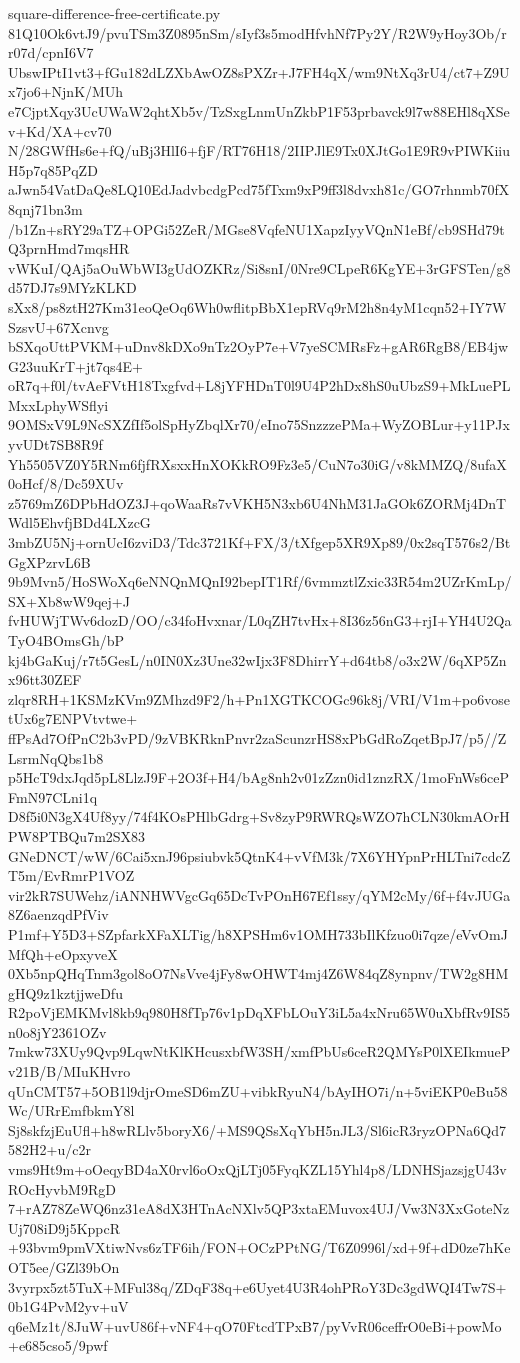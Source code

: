 \documentclass[11pt]{article}
\theoremstyle{definition}
\theoremstyle{remark}
\begin{document}
\begin{filecontents*}[overwrite]{square-difference-free-certificate.py}
81Q10Ok6vtJ9/pvuTSm3Z0895nSm/sIyf3s5modHfvhNf7Py2Y/R2W9yHoy3Ob/rr07d/cpnI6V7
UbswIPtI1vt3+fGu182dLZXbAwOZ8sPXZr+J7FH4qX/wm9NtXq3rU4/ct7+Z9Ux7jo6+NjnK/MUh
e7CjptXqy3UcUWaW2qhtXb5v/TzSxgLnmUnZkbP1F53prbavck9l7w88EHl8qXSev+Kd/XA+cv70
N/28GWfHs6e+fQ/uBj3HlI6+fjF/RT76H18/2IIPJlE9Tx0XJtGo1E9R9vPIWKiiuH5p7q85PqZD
aJwn54VatDaQe8LQ10EdJadvbcdgPcd75fTxm9xP9ff3l8dvxh81c/GO7rhnmb70fX8qnj71bn3m
/b1Zn+sRY29aTZ+OPGi52ZeR/MGse8VqfeNU1XapzIyyVQnN1eBf/cb9SHd79tQ3prnHmd7mqsHR
vWKuI/QAj5aOuWbWI3gUdOZKRz/Si8snI/0Nre9CLpeR6KgYE+3rGFSTen/g8d57DJ7s9MYzKLKD
sXx8/ps8ztH27Km31eoQeOq6Wh0wflitpBbX1epRVq9rM2h8n4yM1cqn52+IY7WSzsvU+67Xcnvg
bSXqoUttPVKM+uDnv8kDXo9nTz2OyP7e+V7yeSCMRsFz+gAR6RgB8/EB4jwG23uuKrT+jt7qs4E+
oR7q+f0l/tvAeFVtH18Txgfvd+L8jYFHDnT0l9U4P2hDx8hS0uUbzS9+MkLuePLMxxLphyWSflyi
9OMSxV9L9NcSXZfIf5olSpHyZbqlXr70/eIno75SnzzzePMa+WyZOBLur+y11PJxyvUDt7SB8R9f
Yh5505VZ0Y5RNm6fjfRXsxxHnXOKkRO9Fz3e5/CuN7o30iG/v8kMMZQ/8ufaX0oHcf/8/Dc59XUv
z5769mZ6DPbHdOZ3J+qoWaaRs7vVKH5N3xb6U4NhM31JaGOk6ZORMj4DnTWdl5EhvfjBDd4LXzcG
3mbZU5Nj+ornUcI6zviD3/Tdc3721Kf+FX/3/tXfgep5XR9Xp89/0x2sqT576s2/BtGgXPzrvL6B
9b9Mvn5/HoSWoXq6eNNQnMQnI92bepIT1Rf/6vmmztlZxic33R54m2UZrKmLp/SX+Xb8wW9qej+J
fvHUWjTWv6dozD/OO/c34foHvxnar/L0qZH7tvHx+8I36z56nG3+rjI+YH4U2QaTyO4BOmsGh/bP
kj4bGaKuj/r7t5GesL/n0IN0Xz3Une32wIjx3F8DhirrY+d64tb8/o3x2W/6qXP5Znx96tt30ZEF
zlqr8RH+1KSMzKVm9ZMhzd9F2/h+Pn1XGTKCOGc96k8j/VRI/V1m+po6vosetUx6g7ENPVtvtwe+
ffPsAd7OfPnC2b3vPD/9zVBKRknPnvr2zaScunzrHS8xPbGdRoZqetBpJ7/p5//ZLsrmNqQbs1b8
p5HcT9dxJqd5pL8LlzJ9F+2O3f+H4/bAg8nh2v01zZzn0id1znzRX/1moFnWs6cePFmN97CLni1q
D8f5i0N3gX4Uf8yy/74f4KOsPHlbGdrg+Sv8zyP9RWRQsWZO7hCLN30kmAOrHPW8PTBQu7m2SX83
GNeDNCT/wW/6Cai5xnJ96psiubvk5QtnK4+vVfM3k/7X6YHYpnPrHLTni7cdcZT5m/EvRmrP1VOZ
vir2kR7SUWehz/iANNHWVgcGq65DcTvPOnH67Ef1ssy/qYM2cMy/6f+f4vJUGa8Z6aenzqdPfViv
P1mf+Y5D3+SZpfarkXFaXLTig/h8XPSHm6v1OMH733bIlKfzuo0i7qze/eVvOmJMfQh+eOpxyveX
0Xb5npQHqTnm3gol8oO7NsVve4jFy8wOHWT4mj4Z6W84qZ8ynpnv/TW2g8HMgHQ9z1kztjjweDfu
R2poVjEMKMvl8kb9q980H8fTp76v1pDqXFbLOuY3iL5a4xNru65W0uXbfRv9IS5n0o8jY2361OZv
7mkw73XUy9Qvp9LqwNtKlKHcusxbfW3SH/xmfPbUs6ceR2QMYsP0lXEIkmuePv21B/B/MIuKHvro
qUnCMT57+5OB1l9djrOmeSD6mZU+vibkRyuN4/bAyIHO7i/n+5viEKP0eBu58Wc/URrEmfbkmY8l
Sj8skfzjEuUfl+h8wRLlv5boryX6/+MS9QSsXqYbH5nJL3/Sl6icR3ryzOPNa6Qd7582H2+u/c2r
vms9Ht9m+oOeqyBD4aX0rvl6oOxQjLTj05FyqKZL15Yhl4p8/LDNHSjazsjgU43vROcHyvbM9RgD
7+rAZ78ZeWQ6nz31eA8dX3HTnAcNXlv5QP3xtaEMuvox4UJ/Vw3N3XxGoteNzUj708iD9j5KppcR
+93bvm9pmVXtiwNvs6zTF6ih/FON+OCzPPtNG/T6Z0996l/xd+9f+dD0ze7hKeOT5ee/GZl39bOn
3vyrpx5zt5TuX+MFul38q/ZDqF38q+e6Uyet4U3R4ohPRoY3Dc3gdWQI4Tw7S+0b1G4PvM2yv+uV
q6eMz1t/8JuW+uvU86f+vNF4+qO70FtcdTPxB7/pyVvR06ceffrO0eBi+powMo+e685cso5/9pwf

\end{filecontents*}
\end{document}
